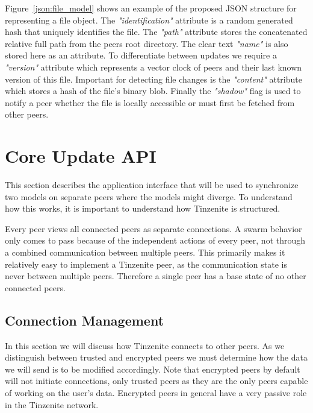 Figure~\ref{json:file_model} shows an example of the proposed JSON structure for representing a file object.
The \textit{"identification"} attribute is a random generated hash that uniquely identifies the file.
The \textit{"path"} attribute stores the concatenated relative full path from the peers root directory.
The clear text \textit{"name"} is also stored here as an attribute.
To differentiate between updates we require a \textit{"version"} attribute which represents a vector clock of peers and their last known version of this file.
Important for detecting file changes is the \textit{"content"} attribute which stores a hash of the file's binary blob.
Finally the \textit{"shadow"} flag is used to notify a peer whether the file is locally accessible or must first be fetched from other peers.

\section{Core Update API}
\label{sec:Core Update API}

This section describes the application interface that will be used to synchronize two models on separate peers where the models might diverge.
To understand how this works, it is important to understand how Tinzenite is structured.

Every peer views all connected peers as separate connections.
A swarm behavior only comes to pass because of the independent actions of every peer, not through a combined communication between multiple peers.
This primarily makes it relatively easy to implement a Tinzenite peer, as the communication state is never between multiple peers.
Therefore a single peer has a base state of no other connected peers.

\subsection{Connection Management}
\label{sec:conn_management}

In this section we will discuss how Tinzenite connects to other peers.
As we distinguish between trusted and encrypted peers we must determine how the data we will send is to be modified accordingly.
Note that encrypted peers by default will not initiate connections, only trusted peers as they are the only peers capable of working on the user's data.
Encrypted peers in general have a very passive role in the Tinzenite network.


